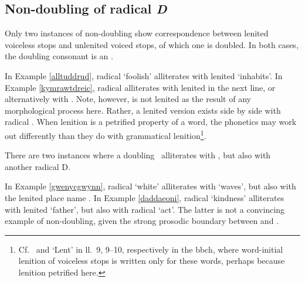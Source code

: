 \subsection{Non-doubling of radical \textit{D}}
Only two instances of non-doubling show correspondence between lenited voiceless stops and unlenited voiced stops, of which one is doubled. In both cases, the doubling consonant is an \xD.
\begin{mwl}
\end{mwl}
In Example \ref{alltuddrud}, radical  `foolish' alliterates with lenited  `inhabits'. In Example \ref{kymrawtdreic},  radical  alliterates with lenited  in the next line, or alternatively with . Note, however,  is not lenited as the result of any morphological process here. Rather, a lenited version exists side by side with radical . When lenition is a petrified property of a word, the phonetics may work out differently than they do with grammatical lenition\footnote{Cf.\   and  `Lent' in ll.~9, 9--10, respectively in the \gls{bbch}, where word-initial lenition of voiceless stops is written only for these words, perhaps because lenition petrified here.}. 

There are two instances where a doubling \xD\ alliterates with \lT, but also with another radical \gls{D}. 
\begin{mwl}
\end{mwl}
In Example \ref{gwenycgwynn}, radical  `white' alliterates with  `waves', but also with the lenited place name . In Example \ref{daddaeoni}, radical  `kindness' alliterates with  lenited  `father', but also with radical  `act'. The latter is not a convincing example of non-doubling, given the strong  prosodic boundary between  and .

